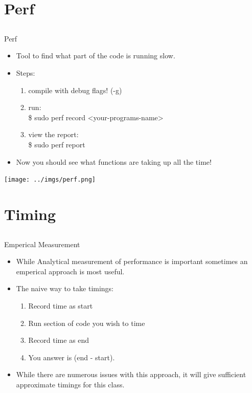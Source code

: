 \documentclass{beamer}
\begin{document}
\section{Perf}
\subsection{}

\begin{frame}{Perf}
\begin{itemize}
\item Tool to find what part of the code is running slow.
\item Steps:
\begin{enumerate}
\item compile with debug flags! (-g)
\item run: \\
\$ sudo perf record <your-programs-name>
\item view the report:\\
\$ sudo perf report
\end{enumerate}
\item Now you should see what functions are taking up all the time!
\end{itemize}
\texttt{[image: ../imgs/perf.png]}
\end{frame}

\section{Timing}
\subsection{}

\begin{frame}{Emperical Measurement}
\begin{itemize}
\item While Analytical measurement of performance is important sometimes an emperical approach is most useful.
\item The naive way to take timings:
\begin{enumerate}
\item Record time as start
\item Run section of code you wish to time
\item Record time as end
\item You answer is (end - start).
\end{enumerate}
\item While there are numerous issues with this approach, it will give sufficient approximate timings for this class.
\end{itemize}
\end{frame}
\end{document}
